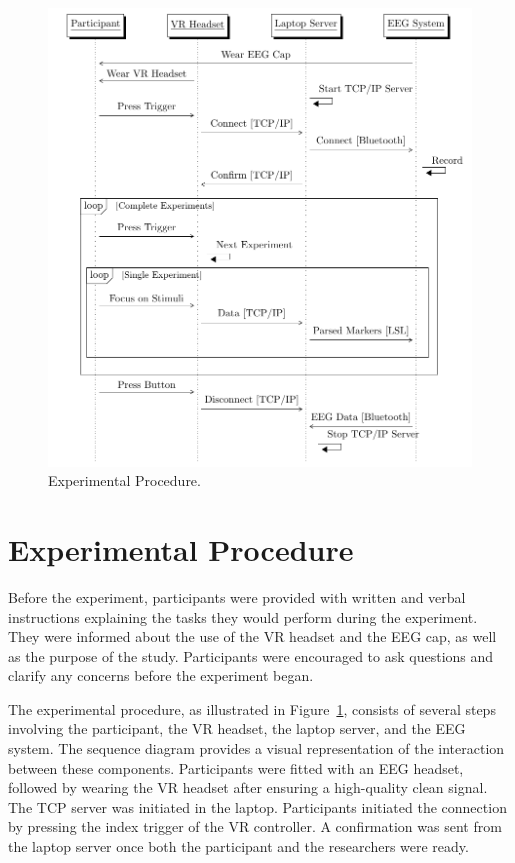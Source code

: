 \clearpage
\begin{figure}
    \centering
    \includegraphics[width=1\textwidth]{images/methods/procedure.pdf}
    \caption{Experimental Procedure.}\label{fig:procedure}
\end{figure}
\clearpage

\section{Experimental Procedure}
Before the experiment, participants were provided with written and verbal instructions explaining the tasks they would perform during the experiment. They were informed about the use of the VR headset and the EEG cap, as well as the purpose of the study. Participants were encouraged to ask questions and clarify any concerns before the experiment began.

The experimental procedure, as illustrated in Figure~\ref{fig:procedure}, consists of several steps involving the participant, the VR headset, the laptop server, and the EEG system. The sequence diagram provides a visual representation of the interaction between these components. Participants were fitted with an EEG headset, followed by wearing the VR headset after ensuring a high-quality clean signal. The TCP server was initiated in the laptop. Participants initiated the connection by pressing the index trigger of the VR controller. A confirmation was sent from the laptop server once both the participant and the researchers were ready.

